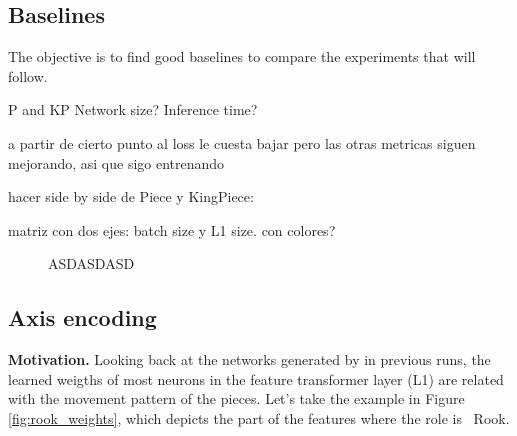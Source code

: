 \subsection{Baselines}

The objective is to find good baselines to compare the experiments that will follow.

P and KP
Network size?
Inference time?

a partir de cierto punto al loss le cuesta bajar pero las otras metricas siguen mejorando, asi que sigo entrenando

hacer side by side de Piece y KingPiece:

matriz con dos ejes: batch size y L1 size. con colores?

\begin{figure}[H]
\centering
{}
\caption{ASDASDASD}
\label{fig:asdasdasd}
\end{figure}



\newpage
\subsection{Axis encoding} %
\label{sec:axis_encoding}

\newcommand{\axisarrows}[1]{\parbox{0.7cm}{\texttt{[image: ../assets/arrows/\#1.pdf]}}}

\textbf{Motivation.} Looking back at the networks generated by  in previous runs, the learned weigths of most neurons in the feature transformer layer (L1) are related with the movement pattern of the pieces. Let's take the example in Figure \ref{fig:rook_weights}, which depicts the  part of the features where the role is \symrook\ Rook.

